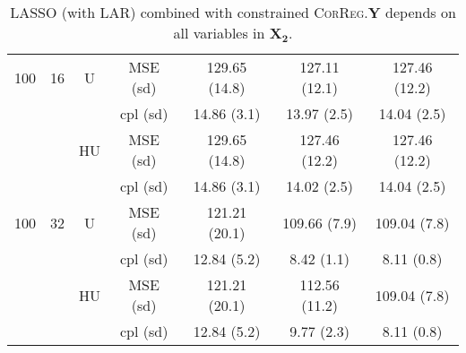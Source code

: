 \documentclass[11pt,a4paper]{article}
\begin{document}
\begin{table}[h!]
\begin{tabular}{|c|c|c|c|c|c|c|}
\hline
\hline %
100 & 16 & U& MSE (sd) & 129.65 (14.8) & 127.11 (12.1) & 127.46 (12.2) \\
& & &  cpl (sd) & 14.86 (3.1) & 13.97 (2.5) & 14.04 (2.5) \\
 &  &HU &  MSE (sd) & 129.65 (14.8) & 127.46 (12.2) & 127.46 (12.2) \\
& & & cpl (sd) & 14.86 (3.1) & 14.02 (2.5) & 14.04 (2.5) \\
\hline %
100 & 32 & U&  MSE (sd) & 121.21 (20.1) & 109.66 (7.9) & 109.04 (7.8) \\
& & & cpl (sd) & 12.84 (5.2) & 8.42 (1.1) & 8.11 (0.8) \\
 &  &HU &  MSE (sd) & 121.21 (20.1) & 112.56 (11.2) & 109.04 (7.8) \\
& & & cpl (sd) & 12.84 (5.2) & 9.77 (2.3) & 8.11 (0.8) \\
\hline
\end{tabular} 
\caption{LASSO (with LAR) combined with constrained \textsc{CorReg}.$\boldsymbol{Y}$  depends on all variables in $\boldsymbol{X_2}$. }\label{YX2linLASSO}
\end{table}
\end{document}
